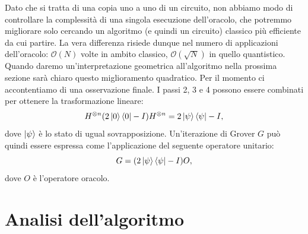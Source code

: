 \documentclass{book}
\theoremstyle{definition}
\theoremstyle{definition}
\theoremstyle{definition}
\theoremstyle{plain}
\theoremstyle{plain}
\theoremstyle{plain}
\theoremstyle{plain}
\begin{document}
Dato che si tratta di una copia uno a uno di un circuito, non abbiamo modo di controllare la complessità di una singola esecuzione dell'oracolo, che potremmo migliorare solo cercando un algoritmo (e quindi un circuito) classico più efficiente da cui partire.
La vera differenza risiede dunque nel numero di applicazioni dell'oracolo: $\mathcal{O}(N)$ volte in ambito classico, $\mathcal{O}(\sqrt{N})$ in quello quantistico. Quando daremo un'interpretazione geometrica all'algoritmo nella prossima sezione sarà chiaro questo miglioramento quadratico. Per il momento ci accontentiamo di una osservazione finale. I passi 2, 3 e 4 possono essere combinati per ottenere la trasformazione lineare:
\begin{displaymath}
H^{\otimes n} (2\ket{0} \bra{0} - I) H^{\otimes n} = 2\ket{\psi}\bra{\psi} - I,
\end{displaymath}
dove $\ket{\psi}$ è lo stato di ugual sovrapposizione. Un'iterazione di Grover $G$ può quindi essere espressa come l'applicazione del seguente operatore unitario:
\begin{displaymath}
G = (2\ket{\psi}\bra{\psi} - I)O,
\end{displaymath}
dove $O$ è l'operatore oracolo.

\section{Analisi dell'algoritmo}
\end{document}
